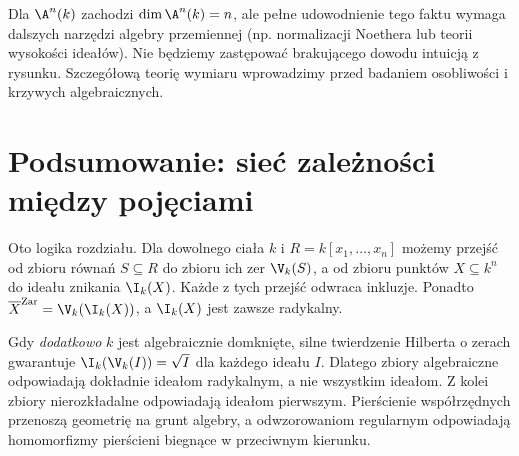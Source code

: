 Dla $\A^n(k)$ zachodzi $\dim\A^n(k)=n$, ale pełne
udowodnienie tego faktu wymaga dalszych narzędzi algebry przemiennej
(np. normalizacji Noethera lub teorii wysokości ideałów).
Nie będziemy zastępować brakującego dowodu intuicją z rysunku.
Szczegółową teorię wymiaru wprowadzimy przed badaniem
osobliwości i krzywych algebraicznych.

\section{Podsumowanie: sieć zależności między pojęciami}

Oto logika rozdziału. Dla dowolnego ciała $k$ i
$R=k[x_1,\dots,x_n]$ możemy przejść od zbioru równań
$S\subseteq R$ do zbioru ich zer $\V_k(S)$, a od zbioru
punktów $X\subseteq k^n$ do ideału znikania $\I_k(X)$.
Każde z tych przejść odwraca inkluzje. Ponadto
$\overline X^{\mathrm{Zar}}=\V_k(\I_k(X))$,
a $\I_k(X)$ jest zawsze radykalny.

Gdy \emph{dodatkowo} $k$ jest algebraicznie domknięte,
silne twierdzenie Hilberta o zerach gwarantuje
$\I_k(\V_k(I))=\sqrt I$ dla każdego ideału $I$.
Dlatego zbiory algebraiczne odpowiadają dokładnie
ideałom radykalnym, a nie wszystkim ideałom.
Z kolei zbiory nierozkładalne odpowiadają ideałom pierwszym.
Pierścienie współrzędnych przenoszą geometrię na grunt algebry,
a odwzorowaniom regularnym odpowiadają homomorfizmy
pierścieni biegnące w przeciwnym kierunku.
